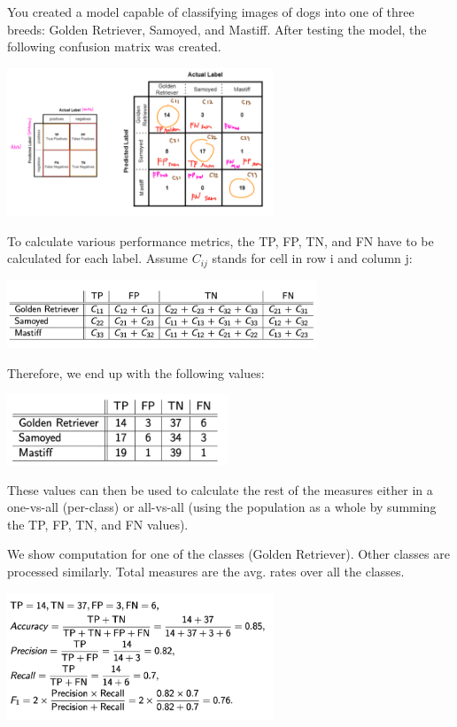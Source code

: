\documentclass{tron}
\begin{document}
\begin{example}
	You created a model capable of classifying images of dogs into one of three breeds: Golden Retriever, Samoyed, and Mastiff. After testing the model, the following confusion matrix was created.
	
	\includegraphics[width = 300px]{Figs/Lec7/ex3-mat}
	
	To calculate various performance metrics, the TP, FP, TN, and FN have to be calculated for each label.
	Assume $C_{ij}$ stands for cell in row i and column j:
	
	\includegraphics[width = 350px]{Figs/Lec7/ex3-table}	
	
	Therefore, we end up with the following values:
	
	\includegraphics[width = 250px]{Figs/Lec7/ex3-table2}	
	
	These values can then be used to calculate the rest of the measures either in a one-vs-all (per-class) or all-vs-all (using the population as a whole by summing the TP, FP, TN, and FN values).
	
	\begin{example}{}
		We show computation for one of the classes (Golden Retriever). Other classes are processed similarly. Total measures are the avg. rates over all the classes. 
	
	\includegraphics[width = 300px]{Figs/Lec7/ex3-one-vs-all}
	\end{example}


\end{example}
\end{document}
